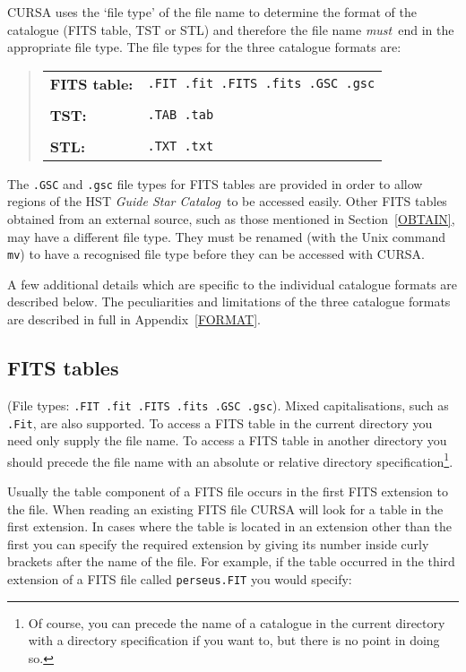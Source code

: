 \documentclass[twoside,11pt]{article}
\renewcommand{\_}{\texttt{\symbol{95}}}
\begin{document}
CURSA uses the `file type' of the file name to determine the format of
the catalogue (FITS table, TST or STL) and therefore the file name {\it
must}\, end in the appropriate file type.  The file types for the three
catalogue formats are:

\begin{quote}
\begin{tabular}{ll}
{\bf FITS table:} & {\tt .FIT .fit .FITS .fits .GSC .gsc}  \\
                  & \\
{\bf TST:}        & {\tt .TAB .tab}  \\
                  & \\
{\bf STL:}        & {\tt .TXT .txt}  \\
\end{tabular}
\end{quote}

The {\tt .GSC} and {\tt .gsc} file types for FITS tables are provided in
order to allow regions of the HST {\it Guide Star Catalog}\, to be accessed
easily. Other FITS tables obtained from an external source, such as those 
mentioned in Section~\ref{OBTAIN}, may have a different file type. They 
must be renamed (with the Unix command {\tt mv}) to have a recognised file
type before they can be accessed with CURSA.

A few additional details which are specific to the individual catalogue
formats are described below. The peculiarities and limitations of the
three catalogue formats are described in full in Appendix~\ref{FORMAT}.

\subsection{FITS tables}

(File types: {\tt .FIT .fit .FITS .fits .GSC .gsc}).  Mixed
capitalisations, such as {\tt .Fit}, are also supported.  To access a FITS
table in the current directory you need only supply the file name. To
access a FITS table in another directory you should precede the file name
with an absolute or relative directory specification\footnote{ Of course,
you can precede the name of a catalogue in the current directory with a
directory specification if you want to, but there is no point in doing
so.}.

Usually the table component of a FITS file occurs in the first FITS
extension to the file. When reading an existing FITS file CURSA will look
for a table in the first extension. In cases where the table is located
in an extension other than the first you can specify the required 
extension by giving its number inside curly brackets after the name
of the file. For example, if the table occurred in the third extension
of a FITS file called {\tt perseus.FIT} you would specify:
\end{document}
